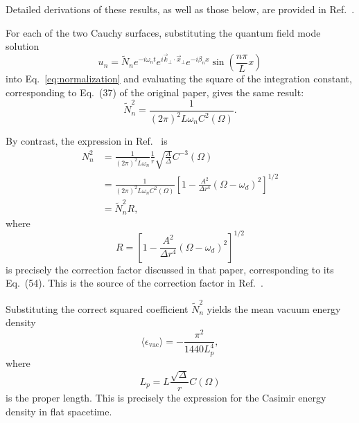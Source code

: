 Detailed derivations of these results, as well as those below, are provided in Ref.~\cite{Yao2026}.

For each of the two Cauchy surfaces, substituting the quantum field mode solution 
\begin{equation}
\label{eq:mode}
u_{n}=\tilde{N}_{n}e^{-i\omega_{n}t}e^{i\vec{k}_{\bot}\cdot\vec{x}_{\bot}}e^{-i\beta_{n}x}\sin\left(\frac{n\pi}{L}x\right)
\end{equation}
 into Eq.~\eqref{eq:normalization} and evaluating the square of the integration constant, corresponding to Eq.~(37) of the original paper, gives the same result: 
\begin{equation}
\label{eq:correct-normalization}
\tilde{N}^{2}_{n}=\frac{1}{\left(2\pi\right)^{2}L\omega_{n}C^{2}\left(\Omega\right)}.
\end{equation}


By contrast, the expression in Ref.~\cite{Sorge2014} is 
\begin{equation}
\label{eq:original-normalization}
\begin{aligned}
N^{2}_{n} & =\frac{1}{\left(2\pi\right)^{2}L\omega_{n}}\frac{1}{r}\sqrt{\frac{A}{\Delta}}C^{-3}\left(\Omega\right)\\
 & =\frac{1}{\left(2\pi\right)^{2}L\omega_{n}C^{2}\left(\Omega\right)}\left[1-\frac{A^{2}}{\Delta r^{4}}\left(\Omega-\omega_{d}\right)^{2}\right]^{1/2}\\
 & =\tilde{N}^{2}_{n}R,
\end{aligned}
\end{equation}
 where 
\begin{equation}
\label{eq:correction}
R=\left[1-\frac{A^{2}}{\Delta r^{4}}\left(\Omega-\omega_{d}\right)^{2}\right]^{1/2}
\end{equation}
 is precisely the correction factor discussed in that paper, corresponding to its Eq.~(54). This is the source of the correction factor in Ref.~\cite{Sorge2014}.

Substituting the correct squared coefficient $\tilde{N}^{2}_{n}$ yields the mean vacuum energy density 
\begin{equation}
\label{eq:energy}
\langle\epsilon_{\text{vac}}\rangle=-\frac{\pi^{2}}{1440L^{4}_{p}},
\end{equation}
 where 
\begin{equation}
\label{eq:proper-length}
L_{p}=L\frac{\sqrt{\Delta}}{r}C\left(\Omega\right)
\end{equation}
 is the proper length. This is precisely the expression for the Casimir energy density in flat spacetime.

